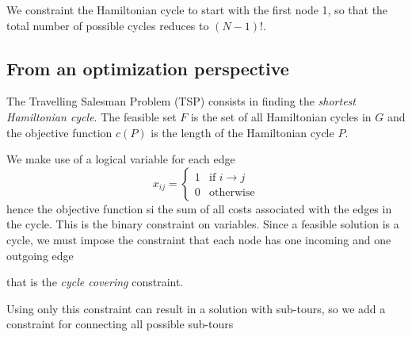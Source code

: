 We constraint the Hamiltonian cycle to start with the first node 1, so that the total number of possible cycles reduces to $(N-1)!$.


\subsection{From an optimization perspective}

The Travelling Salesman Problem (TSP) consists in finding the \emph{shortest Hamiltonian cycle}. The feasible set $F$ is the set of all Hamiltonian cycles in $G$ and the objective function $c(P)$ is the length of the Hamiltonian cycle $P$.

We make use of a logical variable for each edge
\[
x_{ij}=
\begin{cases}
	1 & \text{if $i\rightarrow j$} \\
	0 & \text{otherwise}
\end{cases}
\]
hence the objective function si the sum of all costs associated with the edges in the cycle. This is the binary constraint on variables. Since a feasible solution is a cycle, we must impose the constraint that each node has one incoming and one outgoing edge

\begin{center}
\end{center}
that is the \emph{cycle covering} constraint.\par\medskip

Using only this constraint can result in a solution with sub-tours, so we add a constraint for connecting all possible sub-tours

